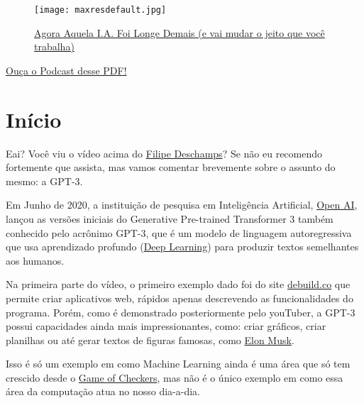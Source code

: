 \documentclass[12pt]{article}
\begin{document}
    \newpage    
    \begin{figure}[htp]
        \centering
        \texttt{[image: maxresdefault.jpg]}
        \caption{\href{https://youtu.be/pbVwH8o837A}{Agora Aquela I.A. Foi Longe Demais (e vai mudar o jeito que você trabalha)}}
    \end{figure}
    
    \begin{caixa}
        \begin{center}
            \href{https://soundcloud.com/gustavo-rodrigues-468052117/ldo-machine-learning-capitulo02?in=gustavo-rodrigues-468052117/sets/ldo-machine-learning}{Ouça o Podcast desse PDF!}
        \end{center}
    \end{caixa}

    \section{Início} \label{sec:gpt-3}

    Eai? Você viu o vídeo acima do \href{https://br.linkedin.com/in/filipedeschamps}{Filipe Deschamps}? 
    Se não eu recomendo fortemente que assista, mas vamos comentar brevemente sobre o assunto 
    do mesmo: a GPT-3.

    Em Junho de 2020, a instituição de pesquisa em Inteligência Artificial,
    \href{https://openai.com/}{Open AI}, lançou as versões iniciais do Generative Pre-trained Transformer 3 também conhecido 
    pelo acrônimo GPT-3, que é um modelo de linguagem autoregressiva que usa 
    aprendizado profundo (\href{https://www.sas.com/pt_br/insights/analytics/deep-learning.html}
    {Deep Learning}) para produzir textos semelhantes aos humanos.

    Na primeira parte do vídeo, o primeiro exemplo dado foi do site \href{https://debuild.co/}{debuild.co} 
    que permite criar aplicativos web, rápidos apenas descrevendo as funcionalidades do programa. 
    Porém, como é demonstrado posteriormente pelo youTuber, a GPT-3 possui capacidades ainda mais 
    impressionantes, como: criar gráficos, criar planilhas ou até gerar textos de 
    figuras famosas, como \href{https://pt.wikipedia.org/wiki/Elon_Musk}{Elon Musk}.

    Isso é só um exemplo em como Machine Learning ainda é uma área que só tem 
    crescido desde o \href{../Capitulo_01/Capitulo01.pdf}{Game of Checkers}, mas não é 
    o único exemplo em como essa área da computação atua no nosso dia-a-dia.
\end{document}
